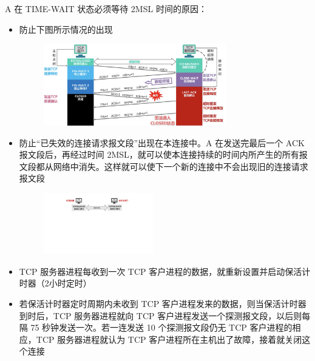 \documentclass[cs4size,a4paper,10pt]{ctexart}
\begin{document}
	A 在 TIME-WAIT 状态必须等待 2MSL 时间的原因：
	\begin{itemize}
		\item 防止下图所示情况的出现
		\begin{figure}[H]
			\centering
			\includegraphics[width=0.75\textwidth]{img/5.8.2}
		\end{figure}
		\item 防止“已失效的连接请求报文段”出现在本连接中。A 在发送完最后一个 ACK 报文段后，再经过时间 2MSL，就可以使本连接持续的时间内所产生的所有报文段都从网络中消失。这样就可以使下一个新的连接中不会出现旧的连接请求报文段
		\begin{figure}[H]
			\centering
			\includegraphics[width=0.45\textwidth]{img/5.8.2.2}
		\end{figure}
		\item TCP 服务器进程每收到一次 TCP 客户进程的数据，就重新设置并启动保活计时器（2小时定时）
		\item 若保活计时器定时周期内未收到 TCP 客户进程发来的数据，则当保活计时器到时后，TCP 服务器进程就向 TCP 客户进程发送一个探测报文段，以后则每隔 75 秒钟发送一次。若一连发送 10 个探测报文段仍无 TCP 客户进程的相应，TCP 服务器进程就认为 TCP 客户进程所在主机出了故障，接着就关闭这个连接
	\end{itemize}
\end{document}
